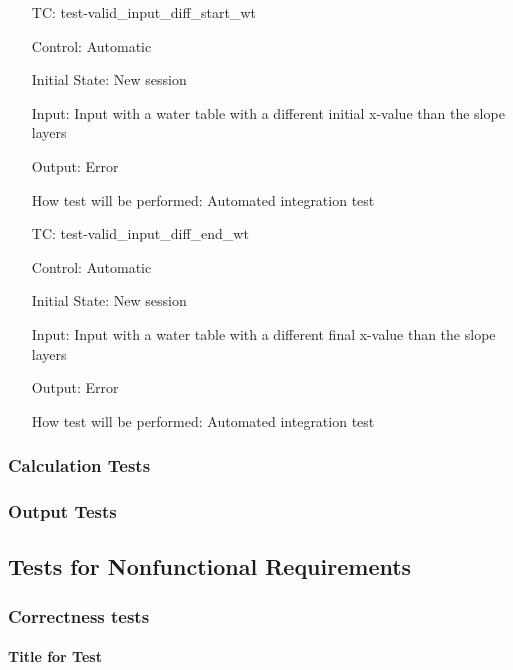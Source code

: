 \documentclass[12pt, titlepage]{article}
\newcounter{testnum} %
\begin{document}
\begin{enumerate}[label=TC\arabic*:,ref={\arabic*}]
	\item [TC\refstepcounter{testnum}\thetestnum: 
	\label{TC_InvalidInDiffStartWT}] 
	test-valid\_input\_diff\_start\_wt
	
	Control: Automatic
	
	Initial State: New session
	
	Input: Input with a water table with a different initial x-value than the 
	slope layers
	
	Output: Error
	
	How test will be performed: Automated integration test
	
	\item [TC\refstepcounter{testnum}\thetestnum: 
	\label{TC_InvalidInDiffEndWT}] 
	test-valid\_input\_diff\_end\_wt
	
	Control: Automatic
	
	Initial State: New session
	
	Input: Input with a water table with a different final x-value than the 
	slope layers
	
	Output: Error
	
	How test will be performed: Automated integration test
	
\end{enumerate}

\subsubsection{Calculation Tests}

\subsubsection{Output Tests}

\subsection{Tests for Nonfunctional Requirements}

\subsubsection{Correctness tests}
		
\paragraph{Title for Test}
\end{document}
